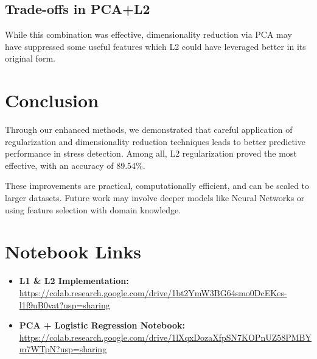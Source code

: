 \documentclass[a4paper,11pt]{article}
\begin{document}
\subsection*{Trade-offs in PCA+L2}
While this combination was effective, dimensionality reduction via PCA may have suppressed some useful features which L2 could have leveraged better in its original form.

\section{Conclusion}
Through our enhanced methods, we demonstrated that careful application of regularization and dimensionality reduction techniques leads to better predictive performance in stress detection. Among all, L2 regularization proved the most effective, with an accuracy of 89.54\%.

\noindent These improvements are practical, computationally efficient, and can be scaled to larger datasets. Future work may involve deeper models like Neural Networks or using feature selection with domain knowledge.

\section*{Notebook Links}
\begin{itemize}
    \item \textbf{L1 \& L2 Implementation:} \url{https://colab.research.google.com/drive/1bt2YmW3BG64smo0DcEKes-l1f9uB0vat?usp=sharing}
    \item \textbf{PCA + Logistic Regression Notebook:} \url{https://colab.research.google.com/drive/1lXqxDozaXfpSN7KOPnUZ58PMBYm7WTpN?usp=sharing}
\end{itemize}
\end{document}
